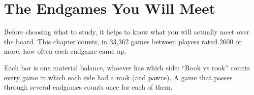 \chapter{The Endgames You Will Meet}\label{ch:meet}
Before choosing what to study, it helps to know what you will actually meet over the board. This chapter counts, in 33,362 games between players rated 2600 or more, how often each endgame came up.

Each bar is one material balance, whoever has which side: “Rook vs rook” counts every game in which each side had a rook (and pawns). A game that passes through several endgames counts once for each of them.

